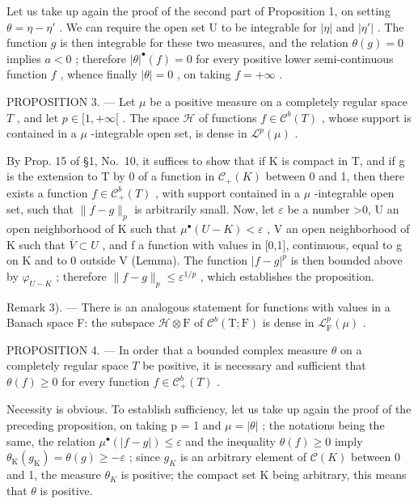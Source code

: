 Let us take up again the proof of the second part of Proposition 1, on setting \(\theta = \eta - \eta'\) . We can require the open set U to be integrable for \(|\eta|\) and \(|\eta'|\) . The function \(g\) is then integrable for these two measures, and the relation \(\theta(g) = 0\) implies \(a < 0\) ; therefore \(|\theta|^{\bullet}(f) = 0\) for every positive lower semi-continuous function \(f\) , whence finally \(|\theta| = 0\) , on taking \(f = +\infty\) .

PROPOSITION 3. --- Let \(\mu\) be a positive measure on a completely regular space \(T\) , and let \(p \in [1, +\infty[\) . The space \(\mathcal{H}\) of functions \(f \in \mathcal{C}^b(T)\) , whose support is contained in a \(\mu\) -integrable open set, is dense in \(\mathcal{L}^p(\mu)\) .

By Prop. 15 of §1, No.~10, it suffices to show that if K is compact in T, and if g is the extension to T by 0 of a function in \(\mathcal{C}_{+}(K)\) between 0 and 1, then there exists a function \(f \in \mathcal{C}_{+}^{b}(T)\) , with support contained in a \(\mu\) -integrable open set, such that \(\|f - g\|_{p}\) is arbitrarily small. Now, let \(\varepsilon\) be a number \textgreater0, U an open neighborhood of K such that \(\mu^{\bullet}(U - K) < \varepsilon\) , V an open neighborhood of K such that \(\overline{V} \subset U\) , and f a function with values in {[}0,1{]}, continuous, equal to g on K and to 0 outside V (Lemma). The function \(|f - g|^{p}\) is then bounded above by \(\varphi_{U-K}\) ; therefore \(\|f - g\|_{p} \leqslant \varepsilon^{1/p}\) , which establishes the proposition.

Remark 3). --- There is an analogous statement for functions with values in a Banach space F: the subspace \(\mathcal{H} \otimes \mathrm{F}\) of \(\mathcal{C}^b (\mathrm{T};\mathrm{F})\) is dense in \(\mathcal{L}_{\mathrm{F}}^{p}(\mu)\) .

PROPOSITION 4. --- In order that a bounded complex measure \(\theta\) on a completely regular space \(T\) be positive, it is necessary and sufficient that \(\theta(f) \geqslant 0\) for every function \(f \in \mathcal{C}_{+}^{b}(T)\) .

Necessity is obvious. To establish sufficiency, let us take up again the proof of the preceding proposition, on taking p = 1 and \(\mu = |\theta|\) ; the notations being the same, the relation \(\mu^{\bullet}(|f - g|) \leqslant \varepsilon\) and the inequality \(\theta(f) \geqslant 0\) imply \(\theta_{\mathrm{K}}(g_{\mathrm{K}}) = \theta(g) \geqslant -\varepsilon\) ; since \(g_{K}\) is an arbitrary element of \(\mathcal{C}(K)\) between 0 and 1, the measure \(\theta_{K}\) is positive; the compact set K being arbitrary, this means that \(\theta\) is positive.

